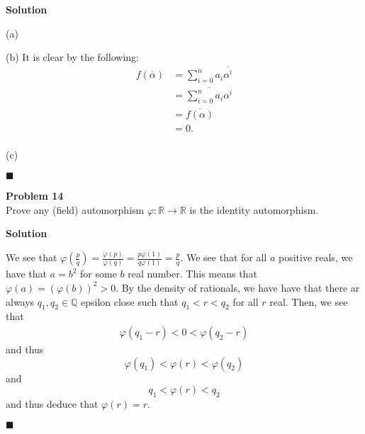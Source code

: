 \documentclass{article}
\theoremstyle{definition}
\newenvironment{problem}[2][Problem]
    { \begin{mdframed}[backgroundcolor=gray!20] \textbf{#1 #2} \\}
    {  \end{mdframed}}
\newenvironment{solution}{\textbf{Solution}}{%
     \hfill$\blacksquare$\par\medskip}
\begin{document}
    \begin{solution}
    
    (a) 
    
    (b) It is clear by the following:
    \begin{align*}
        f\left( \overline{\alpha} \right) &= \sum_{i = 0}^{n} a_{i} \overline{\alpha ^{i}}\\
        &= \overline{ \sum_{i = 0}^{n}a_{i} \alpha ^{i}} \\
        &= \overline{f\left( \alpha \right)} \\
        &= 0. \\
    \end{align*}

    (c)
    
    \end{solution}
    
    \begin{problem}{14}
    
    Prove any (field) automorphism $\varphi : \mathds{R} \to  \mathds{R}$ is the identity automorphism.
    
    \end{problem}
    
    \begin{solution}
    
    We see that $\varphi\left( \frac{p}{q} \right) = \frac{\varphi\left( p \right)}{\varphi\left( q \right)} = \frac{p\varphi\left( 1 \right)}{q\varphi\left( 1 \right)}=\frac{p}{q}$. We see that for all $a$ positive reals, we have that $a = b^{2}$ for some $b$ real number. This means that $\varphi\left( a \right) = \left( \varphi\left( b \right) \right)^{2} > 0$. By the density of rationals, we have have that there ar always $q_1,q_2 \in \mathds{Q}$ epsilon close such that $q_1 < r < q_2$ for all $r$ real. Then, we see that 
    \begin{align*}
        \varphi\left( q_1 - r \right) < 0 < \varphi\left( q_2 - r \right)
    \end{align*}
    and thus
    \begin{equation*}
        \varphi\left( q_1 \right) < \varphi\left( r \right) < \varphi\left( q_2 \right)
    \end{equation*}
    and
    \begin{equation*}
        q_1 < \varphi\left( r \right) < q_2
    \end{equation*}
    and thus deduce that $\varphi\left( r \right) = r$.
    
    
    \end{solution}
    
\end{document}
